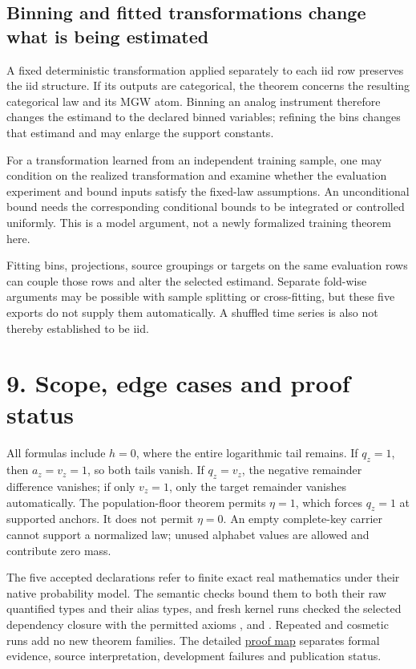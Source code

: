 \documentclass[11pt,a4paper]{article}
\let\PidSavedTexttt\texttt
\renewcommand{\texttt}[1]{\PidSavedTexttt{\seqsplit{#1}}}
\begin{document}
\subsection{Binning and fitted transformations change what is being estimated}\label{binning-and-fitted-transformations-change-what-is-being-estimated}

A fixed deterministic transformation applied separately to each iid row preserves the iid structure. If its outputs are categorical, the theorem concerns the resulting categorical law and its MGW atom. Binning an analog instrument therefore changes the estimand to the declared binned variables; refining the bins changes that estimand and may enlarge the support constants.

For a transformation learned from an independent training sample, one may condition on the realized transformation and examine whether the evaluation experiment and bound inputs satisfy the fixed-law assumptions. An unconditional bound needs the corresponding conditional bounds to be integrated or controlled uniformly. This is a model argument, not a newly formalized training theorem here.

Fitting bins, projections, source groupings or targets on the same evaluation rows can couple those rows and alter the selected estimand. Separate fold-wise arguments may be possible with sample splitting or cross-fitting, but these five exports do not supply them automatically. A shuffled time series is also not thereby established to be iid.

\section{9. Scope, edge cases and proof status}\label{scope-edge-cases-and-proof-status}

All formulas include \(h=0\), where the entire logarithmic tail remains. If \(q_z=1\), then \(a_z=v_z=1\), so both tails vanish. If \(q_z=v_z\), the negative remainder difference vanishes; if only \(v_z=1\), only the target remainder vanishes automatically. The population-floor theorem permits \(\eta=1\), which forces \(q_z=1\) at supported anchors. It does not permit \(\eta=0\). An empty complete-key carrier cannot support a normalized law; unused alphabet values are allowed and contribute zero mass.

The five accepted declarations refer to finite exact real mathematics under their native probability model. The semantic checks bound them to both their raw quantified types and their alias types, and fresh kernel runs checked the selected dependency closure with the permitted axioms \mbox{\texttt{Classical.choice}}, \mbox{\texttt{Quot.sound}} and \mbox{\texttt{propext}}. Repeated and cosmetic runs add no new theorem families. The detailed \href{https://github.com/sepahead/pid-rs/blob/main/audit/formal/lean-prefix-mgw-bias/THEOREM_MAP.md}{proof map} separates formal evidence, source interpretation, development failures and publication status.
\end{document}
